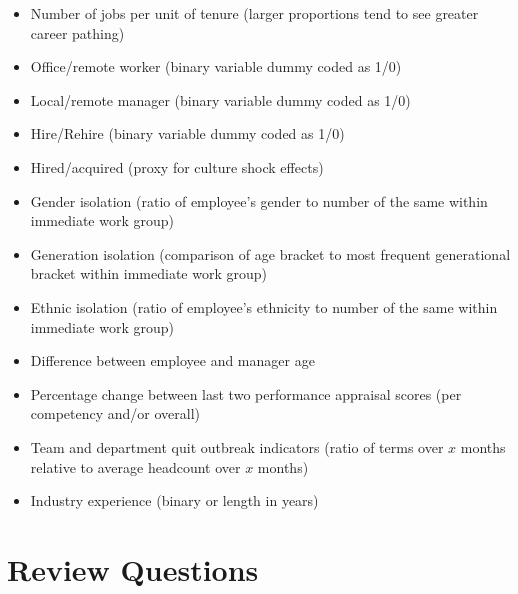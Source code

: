\documentclass[
]{book}
\providecommand{\tightlist}{%
  \setlength{\itemsep}{0pt}\setlength{\parskip}{0pt}}
\begin{document}
\begin{itemize}
\tightlist
\item
  Number of jobs per unit of tenure (larger proportions tend to see greater career pathing)
\item
  Office/remote worker (binary variable dummy coded as 1/0)
\item
  Local/remote manager (binary variable dummy coded as 1/0)
\item
  Hire/Rehire (binary variable dummy coded as 1/0)
\item
  Hired/acquired (proxy for culture shock effects)
\item
  Gender isolation (ratio of employee's gender to number of the same within immediate work
  group)
\item
  Generation isolation (comparison of age bracket to most frequent generational bracket within
  immediate work group)
\item
  Ethnic isolation (ratio of employee's ethnicity to number of the same within immediate work
  group)
\item
  Difference between employee and manager age
\item
  Percentage change between last two performance appraisal scores (per competency and/or
  overall)
\item
  Team and department quit outbreak indicators (ratio of terms over \(x\) months relative to average
  headcount over \(x\) months)
\item
  Industry experience (binary or length in years)
\end{itemize}

\hypertarget{review-questions-4}{%
\section{Review Questions}\label{review-questions-4}}
\end{document}
